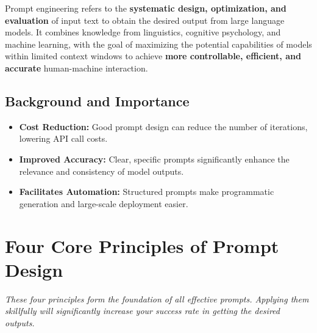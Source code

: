 \documentclass[12pt]{article}
\newcommand{\chapternote}[1]{\vspace{-0.3cm}\par\noindent\textit{\small #1}\vspace{0.3cm}}
\begin{document}
Prompt engineering refers to the \textbf{systematic design, optimization, and evaluation} of input text to obtain the desired output from large language models. It combines knowledge from linguistics, cognitive psychology, and machine learning, with the goal of maximizing the potential capabilities of models within limited context windows to achieve \textbf{more controllable, efficient, and accurate} human-machine interaction.

\subsection{Background and Importance}
\begin{itemize}[leftmargin=2em]
  \item \textbf{Cost Reduction:} Good prompt design can reduce the number of iterations, lowering API call costs.
  \item \textbf{Improved Accuracy:} Clear, specific prompts significantly enhance the relevance and consistency of model outputs.
  \item \textbf{Facilitates Automation:} Structured prompts make programmatic generation and large-scale deployment easier.
\end{itemize}

\section{Four Core Principles of Prompt Design}
\chapternote{These four principles form the foundation of all effective prompts. Applying them skillfully will significantly increase your success rate in getting the desired outputs.}
\end{document}
